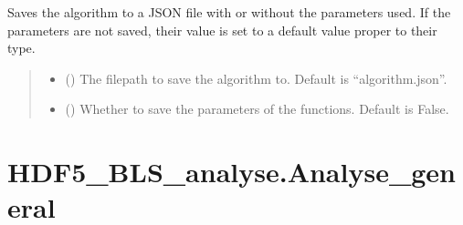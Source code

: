 \documentclass[letterpaper,10pt,english]{sphinxmanual}
\begin{document}
\begin{fulllineitems}
\begin{fulllineitems}
\label{\detokenize{source/_autosummary/HDF5_BLS_analyse.Analyse_backend:HDF5_BLS_analyse.Analyse_backend.silent_save_algorithm}}
\pysigstartsignatures
\pysiglinewithargsret
{}
{\sphinxparamcomma {}}
{}
\pysigstopsignatures
\sphinxAtStartPar
Saves the algorithm to a JSON file with or without the parameters used. If the parameters are not saved, their value is set to a default value proper to their type.
\begin{quote}\begin{description}
\begin{itemize}
\item {} 
\sphinxAtStartPar
{} (\sphinxstyleliteralemphasis{\sphinxupquote{, }}) \textendash{} The filepath to save the algorithm to. Default is “algorithm.json”.

\item {} 
\sphinxAtStartPar
{} (\sphinxstyleliteralemphasis{\sphinxupquote{, }}) \textendash{} Whether to save the parameters of the functions. Default is False.

\end{itemize}

\end{description}\end{quote}

\end{fulllineitems}


\end{fulllineitems}


\sphinxstepscope


\section{HDF5\_BLS\_analyse.Analyse\_general}
\label{\detokenize{source/_autosummary/HDF5_BLS_analyse.Analyse_general:hdf5-bls-analyse-analyse-general}}\label{\detokenize{source/_autosummary/HDF5_BLS_analyse.Analyse_general::doc}}
\end{document}
